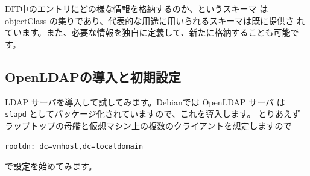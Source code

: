 \documentclass[mingoth,a4paper]{jsarticle}
\begin{document}
DIT中のエントリにどの様な情報を格納するのか、というスキーマ
は objectClass の集りであり、代表的な用途に用いられるスキーマは既に提供さ
れています。また、必要な情報を独自に定義して、新たに格納することも可能です。

\subsection{OpenLDAPの導入と初期設定}

LDAP サーバを導入して試してみます。Debianでは OpenLDAP サーバ
は \texttt{slapd} としてパッケージ化されていますので、これを導入します。
%
とりあえずラップトップの母艦と仮想マシン上の複数のクライアントを想定しますので
\begin{center}
  \texttt{rootdn: dc=vmhost,dc=localdomain}
\end{center}
で設定を始めてみます。
\end{document}
